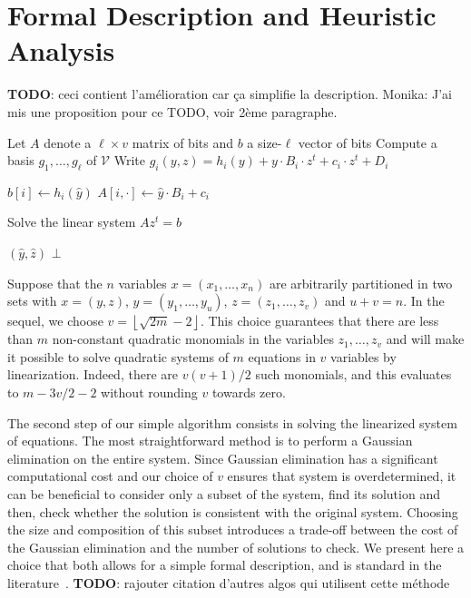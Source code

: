 \documentclass[a4paper,UKenglish,cleveref, autoref]{lipics-v2019}
\newcommand{\bits}{\left\{0, 1\right\}}
\newcommand{\red}{\color{red}}
\newcommand{\TODO}[1]{{\red \textbf{TODO}:} #1\xspace}
\begin{document}
\section{Formal Description and Heuristic Analysis}
\label{sec:description}


\TODO{ceci contient l'amélioration car ça simplifie la description. Monika: J'ai mis une proposition pour ce TODO, voir 2ème paragraphe. }

\begin{algorithm}[t]
  \caption{\label{the-algo}}
\begin{algorithmic}[1]
  \State Let $A$ denote a $\ell \times v$ matrix of bits and $b$ a size-$\ell$
  vector of bits
  \State Compute a basis $g_1, \dots, g_\ell$ of $\mathcal{V}$
  \State Write
  $g_i(y, z) = h_i(y) + y\cdot B_i \cdot z^t + c_i \cdot z^t + D_i$
  \For{$\hat y \in \bits^u$}

  \State $b[i] \gets  h_i(\hat y)$
  \State $A[i, \cdot] \gets \hat y \cdot B_i + c_i$
  \EndFor

  \State Solve the linear system $Az^t = b$

  \State \Return $(\hat y, \hat z)$
  \EndIf
  \EndFor
  \EndFor
  \State \Return $\bot$
\end{algorithmic}
\end{algorithm}


Suppose that the $n$ variables $x = (x_1, \dots, x_n)$ are arbitrarily
partitioned in two sets with $x = (y, z)$, $y = (y_1, \dots, y_{u})$,
$z = (z_1, \dots, z_{v})$ and $u + v = n$. In the sequel, we choose
$v = \left\lfloor \sqrt{2m} - 2 \right\rfloor$. This choice guarantees that
there are less than $m$ non-constant quadratic monomials in the variables
$z_1, \dots, z_v$ and will make it possible to solve quadratic systems of $m$
equations in $v$ variables by linearization. Indeed, there are $v(v+1)/2$ such
monomials, and this evaluates to $m - 3v/2 - 2$ without rounding $v$ towards
zero.

The second step of our simple algorithm consists in solving the linearized system of equations. The most straightforward method is to perform a Gaussian elimination on the entire system. Since Gaussian elimination has a significant computational cost and our choice of $v$ ensures that system is overdetermined, it can be beneficial to consider only a subset of the system, find its solution and then, check whether the solution is consistent with the original system. Choosing the size and composition of this subset introduces a trade-off between the cost of the Gaussian elimination and the number of solutions to check. We present here a choice that both allows for a simple formal description, and is standard in the literature~\cite{--,JouxV17}. \TODO{rajouter citation d'autres algos qui utilisent cette méthode}
\end{document}
